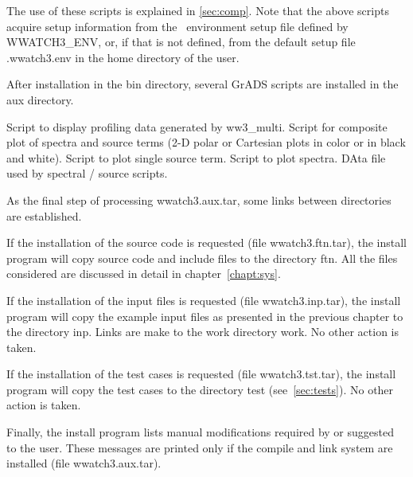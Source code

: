 \noindent
The use of these scripts is explained in \para\ref{sec:comp}.  Note that the
above scripts acquire setup information from the \ws\ environment setup file
defined by {\code WWATCH3\_ENV}, or, if that is not defined, from the default
setup file {\file .wwatch3.env} in the home directory of the user.

\noindent
After installation in the {\dir bin} directory, several GrADS scripts are
installed in the {\dir aux} directory.

\begin{flist}
      {Script to display profiling data generated by {\file
                       ww3\_multi}.} 
       {Script for composite plot of spectra and source
                       terms (2-D polar or Cartesian plots in color or in
                       black and white).}
      {Script to plot single source term.}
         {Script to plot spectra.}
   {DAta file used by spectral / source scripts.}
\end{flist}

\noindent
As the final step of processing {\file wwatch3.aux.tar}, some links between
directories are established.

If the installation of the source code is requested (file {\file
wwatch3.ftn.tar}), the install program will copy source code and include files
to the directory {\dir ftn}. All the files considered are discussed in detail
in chapter~\ref{chapt:sys}.

If the installation of the input files is requested (file {\file
wwatch3.inp.tar}), the install program will copy the example input files as
presented in the previous chapter to the directory {\dir inp}. Links are make
to the work directory {\dir work}. No other action is taken.

If the installation of the test cases is requested (file {\file
wwatch3.tst.tar}), the install program will copy the test cases to the
directory {\dir test} (see~\para\ref{sec:tests}). No other action is taken.

Finally, the install program lists manual modifications required by or
suggested to the user. These messages are printed only if the compile and link
system are installed (file {\file wwatch3.aux.tar}).